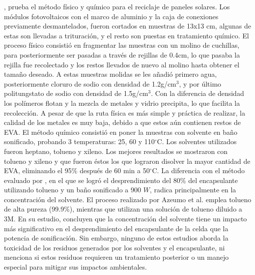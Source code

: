 \citet{Azeumo2019}, prueba el método físico y químico para el reciclaje de paneles solares. Los módulos fotovoltaicos con el marco de aluminio y la caja de conexiones previamente desmantelados, fueron cortados en muestras de 13x13 cm, algunas de estas son llevadas a trituración, y el resto son puestas en tratamiento químico. El proceso físico consistió en fragmentar las muestras con un molino de cuchillas, para posteriormente ser pasadas a través de rejillas de 0.4cm, lo que pasaba la rejilla fue recolectado y los restos llevados de nuevo al molino hasta obtener el tamaño deseado. A estas muestras molidas se les añadió primero agua, posteriormente cloruro de sodio con densidad de 1.2g/cm$^3$, y por último politungstato de sodio con densidad de 1.5g/cm$^3$. Con la diferencia de densidad los polímeros flotan y la mezcla de metales y vidrio precipita, lo que facilita la recolección. A pesar de que la ruta física es más simple y práctica de realizar, la calidad de los metales es muy baja, debido a que estos aún contienen restos de EVA. El método químico consistió en poner la muestras con solvente en baño sonificado, probando 3 temperaturas: 25, 60 y 110$^{\circ}$C. Los solventes utilizados fueron heptano, tolueno y xileno. Los mejores resultados se mostraron con tolueno y xileno y que fueron éstos los que lograron disolver la mayor cantidad de EVA, eliminando el 95\% después de 60 min a 50$^{\circ}$C. La diferencia con el método evaluado por \citet{Kim2012}, en el que se logró el desprendimiento del 80\% del encapsulante utilizando tolueno y un baño sonificado a 900 $W$, radica principalmente en la concentración del solvente. El proceso realizado por Azeumo et al. emplea tolueno de alta pureza (99.9\%), mientras que \citet{Kim2012} utilizan una solución de tolueno diluido a 3M. En su estudio, concluyen que la concentración del solvente tiene un impacto más significativo en el desprendimiento del encapsulante de la celda que la potencia de sonificación. Sin embargo, ninguno de estos estudios aborda la toxicidad de los residuos generados por los solventes y el encapsulante, ni menciona si estos residuos requieren un tratamiento posterior o un manejo especial para mitigar sus impactos ambientales. 

